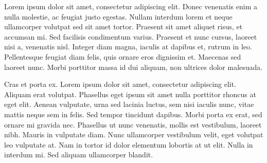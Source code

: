 \documentclass[12pt, a4paper, oneside]{book}
\begin{document}
\begin{spacing}{1.5}
Lorem ipsum dolor sit amet, consectetur adipiscing elit. Donec venenatis enim a nulla molestie, ac feugiat justo egestas. Nullam interdum lorem et neque ullamcorper volutpat sed sit amet tortor. Praesent sit amet aliquet risus, et accumsan mi. Sed facilisis condimentum varius. Praesent et nunc cursus, laoreet nisi a, venenatis nisl. Integer diam magna, iaculis at dapibus et, rutrum in leo. Pellentesque feugiat diam felis, quis ornare eros dignissim et. Maecenas sed laoreet nunc. Morbi porttitor massa id dui aliquam, non ultrices dolor malesuada.

Cras et porta ex. Lorem ipsum dolor sit amet, consectetur adipiscing elit. Aliquam erat volutpat. Phasellus eget ipsum sit amet nulla porttitor rhoncus at eget elit. Aenean vulputate, urna sed lacinia luctus, sem nisi iaculis nunc, vitae mattis neque sem in felis. Sed tempor tincidunt dapibus. Morbi porta ex erat, sed ornare mi gravida nec. Phasellus ut nunc venenatis, mollis est vestibulum, laoreet nibh. Mauris in vulputate diam. Nunc ullamcorper vestibulum velit, eget volutpat leo vulputate at. Nam in tortor id dolor elementum lobortis at ut elit. Nulla in interdum mi. Sed aliquam ullamcorper blandit.
\end{spacing}
\end{document}
